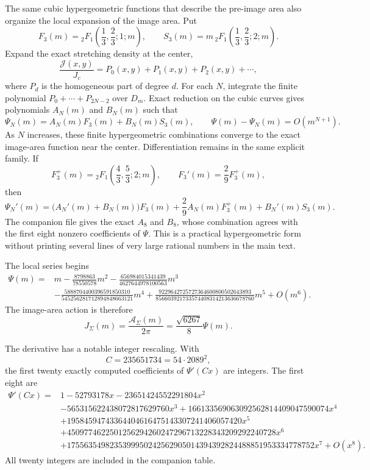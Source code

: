 \documentclass[11pt]{article}
\begin{document}
The same cubic hypergeometric functions that describe the pre-image area also
organize the local expansion of the image area. Put
\[
F_3(m)={}_2F_1\!\left(\frac13,\frac23;1;m\right),
\qquad
S_3(m)=m\,{}_2F_1\!\left(\frac13,\frac23;2;m\right).
\]
Expand the exact stretching density at the center,
\[
\frac{\mathcal J(x,y)}{J_c}=P_0(x,y)+P_1(x,y)+P_2(x,y)+\cdots,
\]
where $P_d$ is the homogeneous part of degree $d$. For each $N$, integrate the
finite polynomial $P_0+\cdots+P_{2N-2}$ over $D_m$. Exact reduction on the
cubic curves gives polynomials $A_N(m)$ and $B_N(m)$ such that
\[
\boxed{
\Psi_N(m)=A_N(m)F_3(m)+B_N(m)S_3(m),
\qquad
\Psi(m)-\Psi_N(m)=O(m^{N+1}).}
\]
As $N$ increases, these finite hypergeometric combinations converge to the
exact image-area function near the center. Differentiation remains in the
same explicit family. If
\[
F_3^+(m)={}_2F_1\!\left(\frac43,\frac53;2;m\right),
\qquad F_3'(m)=\frac29F_3^+(m),
\]
then
\[
\boxed{
\Psi_N'(m)=
\bigl(A_N'(m)+B_N(m)\bigr)F_3(m)
+\frac29A_N(m)F_3^+(m)+B_N'(m)S_3(m).}
\]
The companion file gives the exact $A_8$ and $B_8$, whose combination agrees
with the first eight nonzero coefficients of $\Psi$. This is a practical
hypergeometric form without printing several lines of very large rational
numbers in the main text.

The local series begins
\[
\begin{aligned}
\Psi(m)={}&m
-\frac{8798863}{78550578}m^2
-\frac{656984015341439}{4627644978100563}m^3\\
&-\frac{5888704400396591850310}
{545256281712894848663121}m^4
+\frac{9229642725727364600800502643893}
{856603921733574408314213636678760}m^5+O(m^6).
\end{aligned}
\]
The image-area action is therefore
\[
J_\Sigma(m)=\frac{\mathcal A_\Sigma(m)}{2\pi}
=\frac{\sqrt{6267}}8\Psi(m).
\]

The derivative has a notable integer rescaling. With
\[
C=235651734=54\cdot2089^2,
\]
the first twenty exactly computed coefficients of $\Psi'(Cx)$ are integers.
The first eight are
\[
\begin{aligned}
\Psi'(Cx)={}&1-52793178x-23651424552291804x^2\\
&-565315622438072817629760x^3
+166133569063092562814409047590074x^4\\
&+19584594743364404616475143307241406057420x^5\\
&+4509774622501256294260247296713228343209292240728x^6\\
&+1755635498235399950242562905014394392824488851953334778752x^7
+O(x^8).
\end{aligned}
\]
All twenty integers are included in the companion table.
\end{document}
